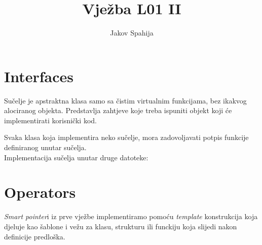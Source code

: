 

\newcommand{\basedir}{~/FESB/2. semestar/3D Simulacije/Izvještaji/vjezba2}
\title{Vježba L01 II}
\author{Jakov Spahija}


\maketitle
\tableofcontents
\pagebreak

\section{Interfaces}
\label{sec:iface}

Sučelje je apstraktna klasa samo sa čistim virtualnim funkcijama, bez ikakvog alociranog objekta. Predstavlja zahtjeve koje treba ispuniti objekt koji će implementirati korisnički kod.

\begin{codesection}
	
\end{codesection}

Svaka klasa koja implementira neko sučelje, mora zadovoljavati potpis funkcije definiranog unutar sučelja.\\
Implementacija sučelja  unutar druge datoteke:

\begin{codelisting}
	
\end{codelisting}


\pagebreak
\begin{codesection}
	
\end{codesection}


\pagebreak

\section{Operators}
\label{sec:ops}
\setcounter{lstlisting}{0}

\emph{Smart pointer}i iz prve vježbe implementiramo pomoću \emph{template} konstrukcija koja djeluje kao šablone i vežu za klasu, strukturu ili funckiju koja slijedi nakon definicije predloška.

